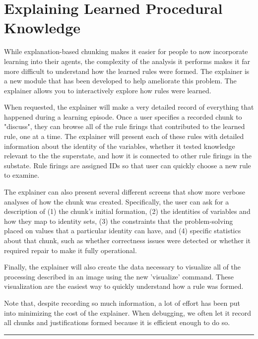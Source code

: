 \section{Explaining Learned Procedural Knowledge}

While explanation-based chunking makes it easier for people to now incorporate learning into their agents, the complexity of the analysis it performs makes it far more difficult to understand how the learned rules were formed. The explainer is a new module that has been developed to help ameliorate this problem. The explainer allows you to interactively explore how rules were learned.
 
When requested, the explainer will make a very detailed record of everything that happened during a learning episode. Once a user specifies a recorded chunk to "discuss", they can browse all of the rule firings that contributed to the learned rule, one at a time. The explainer will present each of these rules with detailed information about the identity of the variables, whether it tested knowledge relevant to the the superstate, and how it is connected to other rule firings in the substate. Rule firings are assigned IDs so that user can quickly choose a new rule to examine.

The explainer can also present several different screens that show more verbose analyses of how the chunk was created. Specifically, the user can ask for a description of (1) the chunk's initial formation, (2) the identities of variables and how they map to identity sets, (3) the constraints that the problem-solving placed on values that a particular identity can have, and (4) specific statistics about that chunk, such as whether correctness issues were detected or whether it required repair to make it fully operational.

Finally, the explainer will also create the data necessary to visualize all of the processing described in an image using the new 'visualize' command. These visualization are the easiest way to quickly understand how a rule was formed.
 
Note that, despite recording so much information, a lot of effort has been put into minimizing the cost of the explainer. When debugging, we often let it record all chunks and justifications formed because it is efficient enough to do so.

\rule{\textwidth}{1pt}

